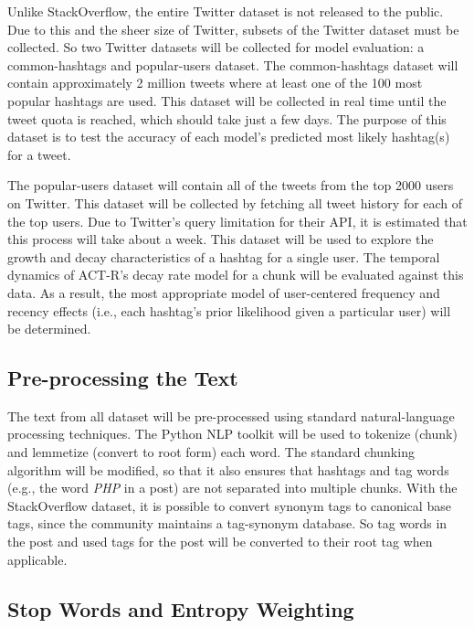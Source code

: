 \documentclass[man,floatsintext]{apa6}
\begin{document}
Unlike StackOverflow, the entire Twitter dataset is not released to the public.
Due to this and the sheer size of Twitter, subsets of the Twitter dataset must be collected.
So two Twitter datasets will be collected for model evaluation: a common-hashtags and popular-users dataset.
The common-hashtags dataset will contain approximately 2 million tweets where at least one of the 100 most popular hashtags are used.
This dataset will be collected in real time until the tweet quota is reached, which should take just a few days.
The purpose of this dataset is to test the accuracy of each model's predicted most likely hashtag(s) for a tweet.

The popular-users dataset will contain all of the tweets from the top \num{2000} users on Twitter.
This dataset will be collected by fetching all tweet history for each of the top users.
Due to Twitter's query limitation for their API, it is estimated that this process will take about a week.
This dataset will be used to explore the growth and decay characteristics of a hashtag for a single user.
The temporal dynamics of ACT-R's decay rate model for a chunk will be evaluated against this data.
As a result, the most appropriate model of user-centered frequency and recency effects (i.e., each hashtag's prior likelihood given a particular user) will be determined.

\subsection{Pre-processing the Text}

The text from all dataset will be pre-processed using standard natural-language processing techniques.
The Python NLP toolkit \parencite{Bird2009} will be used to tokenize (chunk) and lemmetize (convert to root form) each word.
The standard chunking algorithm will be modified, so that it also ensures that hashtags and tag words (e.g., the word \emph{PHP} in a post) are not separated into multiple chunks.
With the StackOverflow dataset, it is possible to convert synonym tags to canonical base tags, since the community maintains a tag-synonym database.
So tag words in the post and used tags for the post will be converted to their root tag when applicable.

\subsection{Stop Words and Entropy Weighting}
\end{document}
